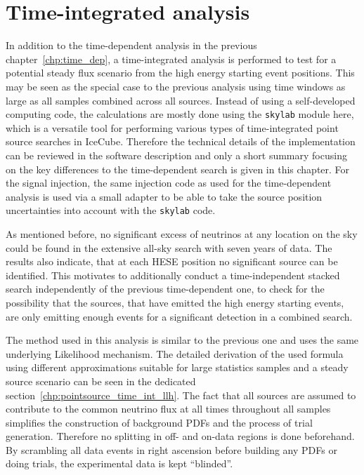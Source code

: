 \chapter{Time-integrated analysis}
  \label{chp:time_indep}
In addition to the time-dependent analysis in the previous chapter~\ref{chp:time_dep}, a time-integrated analysis is performed to test for a potential steady flux scenario from the high energy starting event positions.
This may be seen as the special case to the previous analysis using time windows as large as all samples combined across all sources.
Instead of using a self-developed computing code, the calculations are mostly done using the \lstinline!skylab! \cite{Aartsen:2016oji,skylabrepo} module here, which is a versatile tool for performing various types of time-integrated point source searches in IceCube.
Therefore the technical details of the implementation can be reviewed in the software description and only a short summary focusing on the key differences to the time-dependent search is given in this chapter.
For the signal injection, the same injection code as used for the time-dependent analysis is used via a small adapter to be able to take the source position uncertainties into account with the \lstinline!skylab! code.

As mentioned before, no significant excess of neutrinos at any location on the sky could be found in the extensive all-sky search with seven years of data.
The results also indicate, that at each HESE position no significant source can be identified.
This motivates to additionally conduct a time-independent stacked search independently of the previous time-dependent one, to check for the possibility that the sources, that have emitted the high energy starting events, are only emitting enough events for a significant detection in a combined search.

The method used in this analysis is similar to the previous one and uses the same underlying Likelihood mechanism.
The detailed derivation of the used formula using different approximations suitable for large statistics samples and a steady source scenario can be seen in the dedicated section~\ref{chp:pointsource_time_int_llh}.
The fact that all sources are assumed to contribute to the common neutrino flux at all times throughout all samples simplifies the construction of background PDFs and the process of trial generation.
Therefore no splitting in off- and on-data regions is done beforehand.
By scrambling all data events in right ascension before building any PDFs or doing trials, the experimental data is kept \enquote{blinded}.

